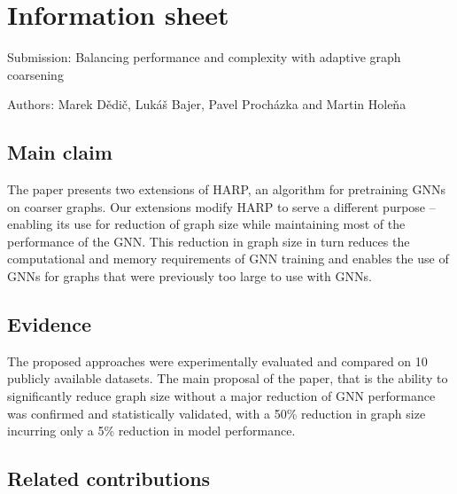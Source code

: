 \documentclass[sn-mathphys,pdflatex]{sn-jnl}%
\begin{document}
\section*{Information sheet}

Submission: Balancing performance and complexity with adaptive graph coarsening

\noindent Authors: Marek Dědič, Lukáš Bajer, Pavel Procházka and Martin Holeňa

\subsection*{Main claim}

The paper presents two extensions of HARP, an algorithm for pretraining GNNs on coarser graphs. Our extensions modify HARP to serve a different purpose -- enabling its use for reduction of graph size while maintaining most of the performance of the GNN. This reduction in graph size in turn reduces the computational and memory requirements of GNN training and enables the use of GNNs for graphs that were previously too large to use with GNNs.

\subsection*{Evidence}
The proposed approaches were experimentally evaluated and compared on 10 publicly available datasets. The main proposal of the paper, that is the ability to significantly reduce graph size without a major reduction of GNN performance was confirmed and statistically validated, with a 50\% reduction in graph size incurring only a 5\% reduction in model performance.

\subsection*{Related contributions}
\end{document}
